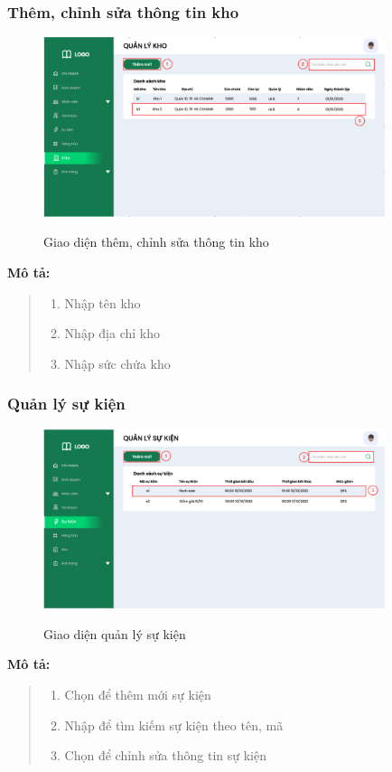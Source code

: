        \subsubsection{Thêm, chỉnh sửa thông tin kho}
            \begin{figure}[!htp]
                \centering
                \includegraphics[width=10cm]{img/UI/admin/warehouse.png}
                \label{33}
                \newline
                \caption{Giao diện thêm, chỉnh sửa thông tin kho}
            \end{figure}
            \textbf{Mô tả:}  
            \begin{quote}
                \begin{enumerate}
                    \item Nhập tên kho
                    \item Nhập địa chỉ kho
                    \item Nhập sức chứa kho
                \end{enumerate}
            \end{quote}
    
    \subsubsection{Quản lý sự kiện}
        \begin{figure}[!htp]
            \centering
            \includegraphics[width=10cm]{img/UI/admin/Event.png}
            \label{34}
            \newline
            \caption{Giao diện quản lý sự kiện}
        \end{figure}
        \textbf{Mô tả:}  
        \begin{quote}
            \begin{enumerate}
                \item Chọn để thêm mới sự kiện
                \item Nhập để tìm kiếm sự kiện theo tên, mã
                \item Chọn để chỉnh sửa thông tin sự kiện
            \end{enumerate}
        \end{quote}
